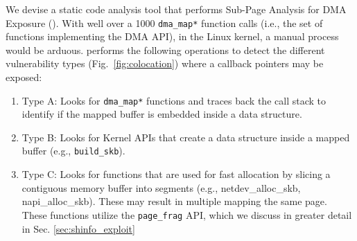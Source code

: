 We devise a static code analysis tool that performs Sub-Page Analysis for DMA Exposure (\tool). With well over a 1000 \texttt{dma\_map*} function calls (i.e., the set of functions implementing the DMA API), in the Linux kernel, a manual process would be arduous. \tool performs the following operations to detect the different \subpage{} vulnerability types (Fig.~\ref{fig:colocation}) where a callback pointers may be exposed:
\begin{enumerate}
    \item Type A: Looks for \texttt{dma\_map*} functions and traces back the call stack to identify if the mapped buffer is embedded inside a data structure.
    \item Type B: Looks for Kernel APIs that create a data structure inside a mapped buffer (e.g., \texttt{build\_skb}).
    \item Type C: Looks for functions that are used for fast allocation by slicing a contiguous memory buffer into segments (e.g., netdev\_alloc\_skb, napi\_alloc\_skb). These may result in multiple \iova{} mapping the same page. These functions utilize the \texttt{page\_frag} API, which we discuss in greater detail in Sec. \ref{sec:shinfo_exploit} 
\end{enumerate}




